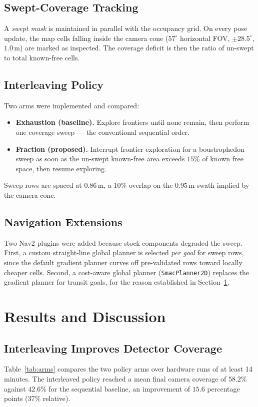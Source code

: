 \documentclass[conference,a4paper,10pt]{IEEEtran}
\begin{document}
\subsection{Swept-Coverage Tracking}
A \emph{swept mask} is maintained in parallel with the occupancy grid. On every
pose update, the map cells falling inside the camera cone
(\(57^{\circ}\) horizontal FOV, \(\pm 28.5^{\circ}\), \(1.0\,\mathrm{m}\)) are marked as inspected. The
coverage deficit is then the ratio of un-swept to total known-free cells.

\subsection{Interleaving Policy}
Two arms were implemented and compared:
\begin{itemize}
  \item \textbf{Exhaustion (baseline).} Explore frontiers until none remain,
        then perform one coverage sweep --- the conventional sequential order.
  \item \textbf{Fraction (proposed).} Interrupt frontier exploration for a
        boustrophedon sweep as soon as the un-swept known-free area exceeds
        \(15\%\) of known free space, then resume exploring.
\end{itemize}
Sweep rows are spaced at \(0.86\,\mathrm{m}\), a \(10\%\) overlap on the
\(0.95\,\mathrm{m}\) swath implied by the camera cone.

\subsection{Navigation Extensions}
Two Nav2 plugins were added because stock components degraded the sweep.
First, a custom straight-line global planner is selected \emph{per goal} for
sweep rows, since the default gradient planner curves off pre-validated rows
toward locally cheaper cells. Second, a cost-aware global
planner (\texttt{SmacPlanner2D}) replaces the gradient planner for transit
goals, for the reason established in Section~\ref{sec:results}.

\section{Results and Discussion}
\label{sec:results}

\subsection{Interleaving Improves Detector Coverage}
Table~\ref{tab:arms} compares the two policy arms over hardware runs of at
least 14 minutes. The interleaved policy reached a mean final camera coverage
of \(58.2\%\) against \(42.6\%\) for the sequential baseline, an improvement of
\(15.6\) percentage points (\(37\%\) relative).
\end{document}
